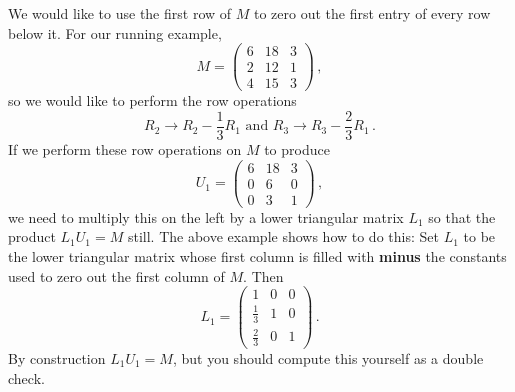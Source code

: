 \vspace{2mm}
We would like to  use the first row of $M$ to zero out the first entry of every row below it.  For our running example, $$M=\begin{pmatrix}
6 & 18 & 3 \\
2 & 12 & 1 \\
4 & 15 & 3 
\end{pmatrix}\, ,$$ so we would like to perform the row operations $$R_2\to R_2 -\frac 13 R_1 \mbox{ and } R_3\to R_3-\frac 23R_1\, .$$
If we perform these row operations on $M$ to produce 
$$U_1=\begin{pmatrix}
6 & 18 & 3 \\
0 & 6 & 0 \\
0 & 3 & 1 
\end{pmatrix}\, ,$$
we need to multiply this on the left by a lower triangular matrix $L_1$ so that the product $L_1U_1=M$ still.
The above example shows how to do this:
Set $L_1$ to be the lower triangular matrix whose first column is filled with  {\bf minus} the constants used to zero out the first column of $M$.  Then $$L_1 = \begin{pmatrix}
1 & 0 & 0 \\[1mm]
\frac{1}{3} & 1 & 0 \\[1mm]
\frac{2}{3} & 0 & 1 
\end{pmatrix}\, .$$  
By construction $L_1 U_1=M$, but you should compute this yourself as a double check.

